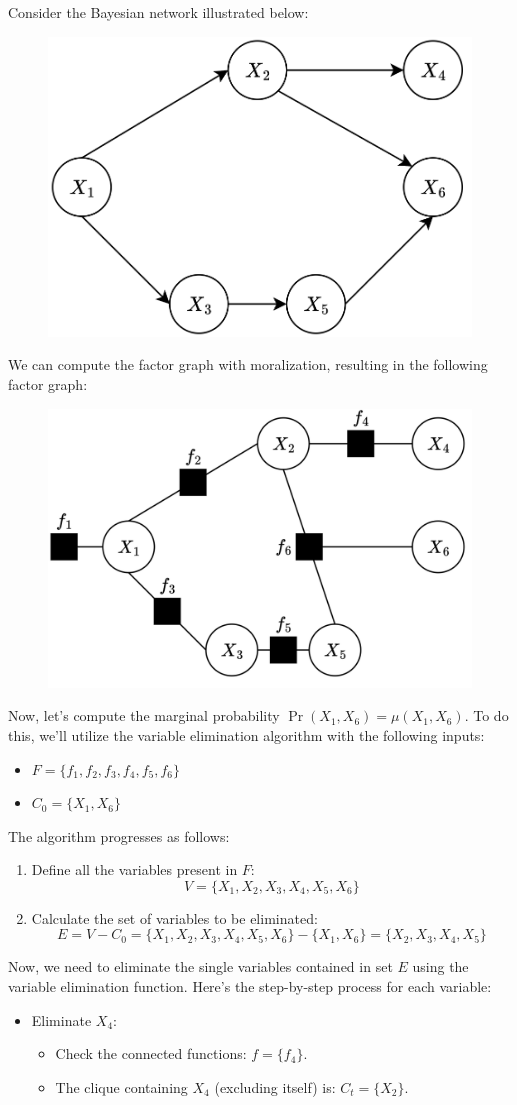 \begin{example}
    Consider the Bayesian network illustrated below:
    \begin{figure}[H]
        \centering
        \includegraphics[width=0.25\linewidth]{images/bn.png}
    \end{figure}
    We can compute the factor graph with moralization, resulting in the following factor graph:
    \begin{figure}[H]
        \centering
        \includegraphics[width=0.25\linewidth]{images/bnf1.png}
    \end{figure}
    Now, let's compute the marginal probability $\Pr(X_1,X_6)=\mu(X_1,X_6)$. To do this, we'll utilize the variable elimination algorithm with the following inputs:
    \begin{itemize}
        \item $F=\{f_1,f_2,f_3,f_4,f_5,f_6\}$
        \item $C_0=\{X_1,X_6\}$
    \end{itemize}
    The algorithm progresses as follows:
    \begin{enumerate}
        \item Define all the variables present in $F$: 
            \[V=\{X_1,X_2,X_3,X_4,X_5,X_6\}\]
        \item Calculate the set of variables to be eliminated:
            \[E=V-C_0=\{X_1,X_2,X_3,X_4,X_5,X_6\}-\{X_1,X_6\}=\{X_2,X_3,X_4,X_5\}\]
    \end{enumerate}
    Now, we need to eliminate the single variables contained in set $E$ using the variable elimination function.
    Here's the step-by-step process for each variable:
    \begin{itemize}
        \item Eliminate $X_4$: 
            \begin{itemize}
                \item Check the connected functions: $f=\{f_4\}$. 
                \item The clique containing $X_4$ (excluding itself) is: $C_t=\{X_2\}$. 

\end{itemize}
\end{itemize}
\end{example}
